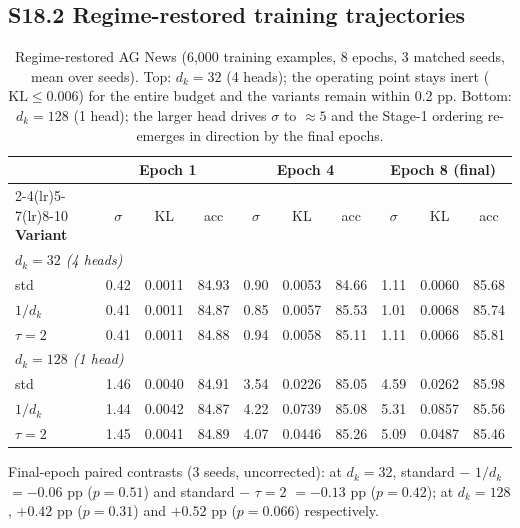 \documentclass[10pt,a4paper]{article}
\newcommand{\dk}{d_k}
\newcommand{\pp}{\,pp}
\begin{document}
\subsection*{S18.2 Regime-restored training trajectories}
\begin{table}[H]
  \centering
  \caption{Regime-restored AG News (6{,}000 training examples, 8 epochs,
  3 matched seeds, mean over seeds). Top: $d_k = 32$ (4 heads); the operating
  point stays inert ($\mathrm{KL} \le 0.006$) for the entire budget and the
  variants remain within 0.2\,\pp. Bottom: $d_k = 128$ (1 head); the larger
  head drives $\sigma$ to $\approx 5$ and the Stage-1 ordering re-emerges in
  direction by the final epochs.}
  \label{tab:s18-regime}
  \small
  \begin{tabular*}{\textwidth}{@{\extracolsep{\fill}} l ccc ccc ccc}
    \toprule
    & \multicolumn{3}{c}{\textbf{Epoch 1}} & \multicolumn{3}{c}{\textbf{Epoch 4}} &
      \multicolumn{3}{c}{\textbf{Epoch 8 (final)}} \\
    \cmidrule(lr){2-4}\cmidrule(lr){5-7}\cmidrule(lr){8-10}
    \textbf{Variant} & $\sigma$ & KL & acc & $\sigma$ & KL & acc &
    $\sigma$ & KL & acc \\
    \midrule
    \multicolumn{10}{l}{\emph{$d_k = 32$ (4 heads)}} \\
    std  & 0.42 & 0.0011 & 84.93 & 0.90 & 0.0053 & 84.66 & 1.11 & 0.0060 & 85.68 \\
    $1/\dk$ & 0.41 & 0.0011 & 84.87 & 0.85 & 0.0057 & 85.53 & 1.01 & 0.0068 & 85.74 \\
    $\tau{=}2$ & 0.41 & 0.0011 & 84.88 & 0.94 & 0.0058 & 85.11 & 1.11 & 0.0066 & 85.81 \\
    \midrule
    \multicolumn{10}{l}{\emph{$d_k = 128$ (1 head)}} \\
    std  & 1.46 & 0.0040 & 84.91 & 3.54 & 0.0226 & 85.05 & 4.59 & 0.0262 & 85.98 \\
    $1/\dk$ & 1.44 & 0.0042 & 84.87 & 4.22 & 0.0739 & 85.08 & 5.31 & 0.0857 & 85.56 \\
    $\tau{=}2$ & 1.45 & 0.0041 & 84.89 & 4.07 & 0.0446 & 85.26 & 5.09 & 0.0487 & 85.46 \\
    \bottomrule
  \end{tabular*}
\end{table}

Final-epoch paired contrasts (3 seeds, uncorrected): at $d_k = 32$,
standard $-$ $1/\dk$ $= -0.06$\,\pp{} ($p = 0.51$) and standard $-$ $\tau = 2$
$= -0.13$\,\pp{} ($p = 0.42$); at $d_k = 128$, $+0.42$\,\pp{} ($p = 0.31$)
and $+0.52$\,\pp{} ($p = 0.066$) respectively.
\end{document}
